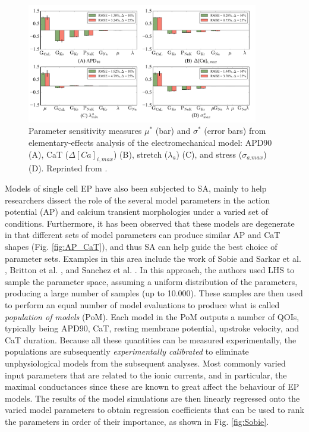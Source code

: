 \documentclass[12pt]{article}
\begin{document}
{\begin{figure}[h]
	\centering
	\includegraphics[width=0.9\textwidth]{images/Hurtado2.png}
	\caption{Parameter sensitivity measures $\mu^{*}$ (bar) and $\sigma^{*}$ (error bars) from elementary-effects analysis of the electromechanical model: APD90 (A),  CaT ($\Delta[Ca]_{i, max}$) (B), stretch ($\lambda_{a}$) (C), and stress ($\sigma_{a.max}$) (D). Reprinted from \cite{Hurtado}.}
	\label{fig:Hurtado2}
\end{figure}

\vspace{0.5cm}
Models of single cell EP have also been subjected to SA, mainly to help researchers dissect the role of the several model parameters in the action potential (AP) and calcium transient morphologies under a varied set of conditions. Furthermore, it has been observed that these models are degenerate in that different sets of model parameters can produce similar AP and CaT shapes (Fig. \ref{fig:AP_CaT}), and thus SA can help guide the best choice of parameter sets.  Examples in this area include the work of Sobie and Sarkar et al. \cite{SOBIE20091264,Sobie2010}, Britton et al. \cite{BrittonE2098}, and Sanchez et al. \cite{Sanchez}. In this approach, the authors used LHS to sample the parameter space, assuming a uniform distribution of the parameters, producing a large number of samples (up to 10.000). These samples are then used to perform an equal number of model evaluations to produce what is called \textit{population of models} (PoM). Each model in the PoM outputs a number of QOIs, typically being APD90, CaT, resting membrane potential, upstroke velocity, and CaT duration. Because all these quantities can be measured experimentally, the populations are subsequently \textit{experimentally calibrated} to eliminate unphysiological models from the subsequent analyses. Most commonly varied input parameters that are related to the ionic currents, and in particular, the maximal conductances since these are known to great affect the behaviour of EP models. The results of the model simulations are then linearly regressed onto the varied model parameters to obtain regression coefficients that can be used to rank the parameters in order of their importance, as shown in Fig. \ref{fig:Sobie}. 

}
\end{document}
